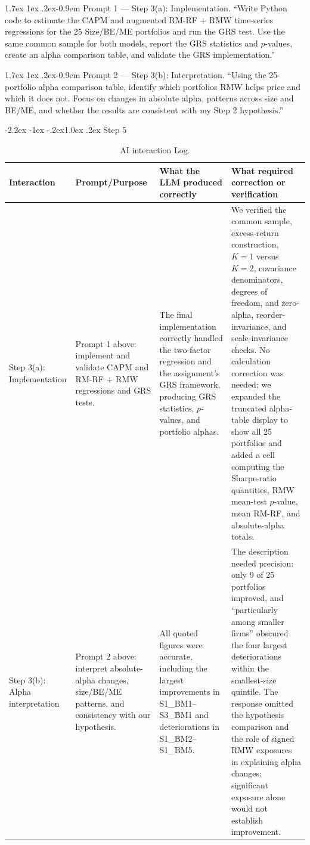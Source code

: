 \documentclass[11pt]{article}
\makeatletter
\renewcommand\subsection{\@startsection{subsection}{2}{0pt}%
  {-2.2ex \@plus -1ex \@minus -.2ex}{1.0ex \@plus .2ex}%
  {\normalfont\bfseries\normalsize\color{psink}}}
\renewcommand\paragraph{\@startsection{paragraph}{4}{0pt}%
  {1.7ex \@plus 1ex \@minus .2ex}{-0.9em}%
  {\normalfont\bfseries\normalsize\color{psink}}}
\makeatother
\begin{document}
\paragraph{Prompt 1 --- Step 3(a): Implementation.} ``Write Python code to
estimate the CAPM and augmented RM-RF + RMW time-series regressions for the
25 Size/BE/ME portfolios and run the GRS test. Use the same common sample for
both models, report the GRS statistics and $p$-values, create an alpha
comparison table, and validate the GRS implementation.''

\paragraph{Prompt 2 --- Step 3(b): Interpretation.} ``Using the 25-portfolio
alpha comparison table, identify which portfolios RMW helps price and which
it does not. Focus on changes in absolute alpha, patterns across size and
BE/ME, and whether the results are consistent with my Step 2 hypothesis.''

\subsection{Step 5}

\begin{table}[H]
\centering
\caption{AI interaction Log.}
\footnotesize
\begin{tabular}{p{}p{}p{}p{}}
\toprule
Interaction & Prompt/Purpose & What the LLM produced correctly & What required correction or verification \\
\midrule
Step 3(a): Implementation & Prompt 1 above: implement and validate CAPM and
RM-RF + RMW regressions and GRS tests. & The final implementation correctly
handled the two-factor regression and the assignment's GRS framework,
producing GRS statistics, $p$-values, and portfolio alphas. & We verified the
common sample, excess-return construction, $K=1$ versus $K=2$, covariance
denominators, degrees of freedom, and zero-alpha, reorder-invariance, and
scale-invariance checks. No calculation correction was needed; we expanded
the truncated alpha-table display to show all 25 portfolios and added a cell
computing the Sharpe-ratio quantities, RMW mean-test $p$-value, mean RM-RF,
and absolute-alpha totals. \\
\addlinespace
Step 3(b): Alpha interpretation & Prompt 2 above: interpret absolute-alpha
changes, size/BE/ME patterns, and consistency with our hypothesis. & All
quoted figures were accurate, including the largest improvements in
S1\_BM1--S3\_BM1 and deteriorations in S1\_BM2--S1\_BM5. & The description
needed precision: only 9 of 25 portfolios improved, and ``particularly among
smaller firms'' obscured the four largest deteriorations within the
smallest-size quintile. The response omitted the hypothesis comparison and
the role of signed RMW exposures in explaining alpha changes; significant
exposure alone would not establish improvement. \\
\bottomrule
\end{tabular}
\label{tab:cap_log}
\end{table}
\end{document}
